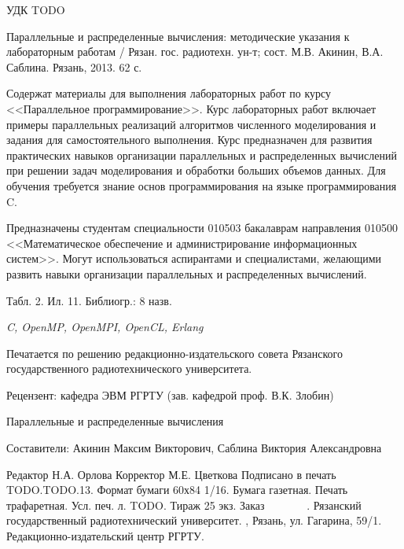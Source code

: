 
\thispagestyle{empty}

{\raggedright УДК TODO}

Параллельные и распределенные вычисления: методические указания к лабораторным работам / Рязан. гос. радиотехн. ун-т; сост. М.В. Акинин, В.А. Саблина. Рязань, 2013. 62 с. %

Содержат материалы для выполнения лабораторных работ по курсу <<Параллельное программирование>>. Курс лабораторных работ включает примеры параллельных реализаций алгоритмов численного моделирования и задания для самостоятельного выполнения. Курс предназначен для развития практических навыков организации параллельных и распределенных вычислений при решении задач моделирования и обработки больших объемов данных. Для обучения требуется знание основ программирования на языке программирования C.

Предназначены студентам специальности 010503 бакалаврам направления 010500 <<Математическое обеспечение и администрирование информационных систем>>. Могут использоваться аспирантами и специалистами, желающими развить навыки организации параллельных и распределенных вычислений.

Табл. 2. Ил. 11. Библиогр.: 8 назв.

\bigskip
\textit{C, OpenMP, OpenMPI, OpenCL, Erlang}
\bigskip

Печатается по решению редакционно-издательского совета Рязанского государственного радиотехнического университета.

Рецензент: кафедра ЭВМ РГРТУ (зав. кафедрой проф. В.К. Злобин)

\vspace{0.5cm}

\begin{center}
Параллельные и распределенные вычисления

\bigskip

Составители: Акинин Максим Викторович, Саблина Виктория Александровна

\vspace{0.3cm}

Редактор Н.А. Орлова \linebreak
Корректор М.Е. Цветкова \linebreak
Подписано в печать TODO.TODO.13. Формат бумаги 60х84 1/16. \linebreak
Бумага газетная. Печать трафаретная. Усл. печ. л. TODO. \linebreak
Тираж 25 экз. Заказ ~~~~~~~. \linebreak
Рязанский государственный радиотехнический университет. , Рязань, ул. Гагарина, 59/1. \linebreak
Редакционно-издательский центр РГРТУ.
\end{center}

\clearpage

\setcounter{page}{3}

